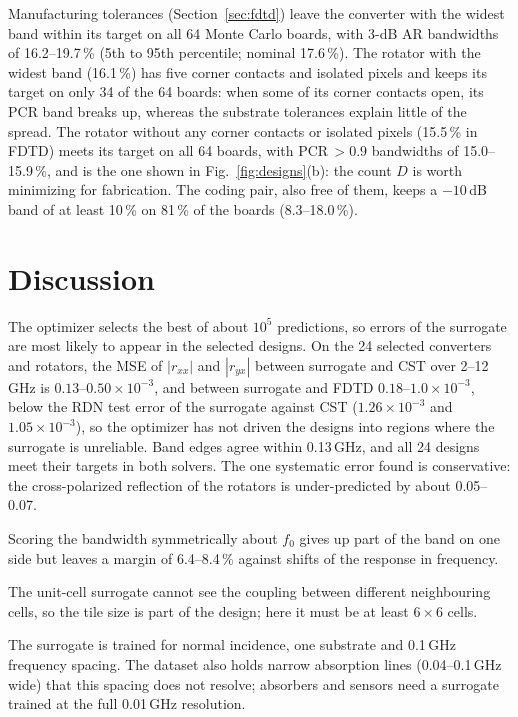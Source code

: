 \documentclass[journal]{IEEEtran}
\newcommand{\e}[2]{\ensuremath{#1{\times}10^{#2}}}
\begin{document}
Manufacturing tolerances (Section~\ref{sec:fdtd}) leave the converter with the widest band within its target on all 64 Monte Carlo boards, with 3-dB AR bandwidths of 16.2--19.7\,\% (5th to 95th percentile; nominal 17.6\,\%). The rotator with the widest band (16.1\,\%) has five corner contacts and isolated pixels and keeps its target on only 34 of the 64 boards: when some of its corner contacts open, its PCR band breaks up, whereas the substrate tolerances explain little of the spread. The rotator without any corner contacts or isolated pixels (15.5\,\% in FDTD) meets its target on all 64 boards, with PCR\,$>0.9$ bandwidths of 15.0--15.9\,\%, and is the one shown in Fig.~\ref{fig:designs}(b): the count $D$ is worth minimizing for fabrication. The coding pair, also free of them, keeps a $-10$\,dB band of at least 10\,\% on 81\,\% of the boards (8.3--18.0\,\%).

\section{Discussion}
The optimizer selects the best of about $10^5$ predictions, so errors of the surrogate are most likely to appear in the selected designs. On the 24 selected converters and rotators, the MSE of $|r_{xx}|$ and $|r_{yx}|$ between surrogate and CST over 2--12\,GHz is \e{0.13\text{--}0.50}{-3}, and between surrogate and FDTD \e{0.18\text{--}1.0}{-3}, below the RDN test error of the surrogate against CST (\e{1.26}{-3} and \e{1.05}{-3}), so the optimizer has not driven the designs into regions where the surrogate is unreliable. Band edges agree within 0.13\,GHz, and all 24 designs meet their targets in both solvers. The one systematic error found is conservative: the cross-polarized reflection of the rotators is under-predicted by about 0.05--0.07.

Scoring the bandwidth symmetrically about $f_0$ gives up part of the band on one side but leaves a margin of 6.4--8.4\,\% against shifts of the response in frequency.

The unit-cell surrogate cannot see the coupling between different neighbouring cells, so the tile size is part of the design; here it must be at least $6\times6$ cells.

The surrogate is trained for normal incidence, one substrate and 0.1\,GHz frequency spacing. The dataset also holds narrow absorption lines (0.04--0.1\,GHz wide) that this spacing does not resolve; absorbers and sensors need a surrogate trained at the full 0.01\,GHz resolution.
\end{document}
